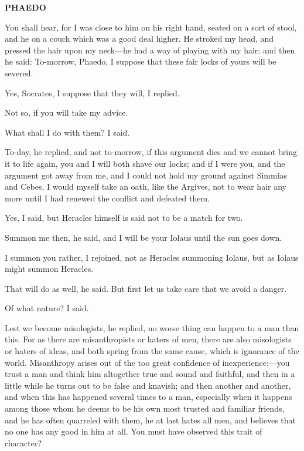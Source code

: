 \documentclass[11pt,letter]{article}
\begin{document}
\par \textbf{PHAEDO}
\par   You shall hear, for I was close to him on his right hand, seated on a sort of stool, and he on a couch which was a good deal higher. He stroked my head, and pressed the hair upon my neck—he had a way of playing with my hair; and then he said:  To-morrow, Phaedo, I suppose that these fair locks of yours will be severed.

\par  Yes, Socrates, I suppose that they will, I replied.

\par  Not so, if you will take my advice.

\par  What shall I do with them? I said.

\par  To-day, he replied, and not to-morrow, if this argument dies and we cannot bring it to life again, you and I will both shave our locks; and if I were you, and the argument got away from me, and I could not hold my ground against Simmias and Cebes, I would myself take an oath, like the Argives, not to wear hair any more until I had renewed the conflict and defeated them.

\par  Yes, I said, but Heracles himself is said not to be a match for two.

\par  Summon me then, he said, and I will be your Iolaus until the sun goes down.

\par  I summon you rather, I rejoined, not as Heracles summoning Iolaus, but as Iolaus might summon Heracles.

\par  That will do as well, he said. But first let us take care that we avoid a danger.

\par  Of what nature? I said.

\par  Lest we become misologists, he replied, no worse thing can happen to a man than this. For as there are misanthropists or haters of men, there are also misologists or haters of ideas, and both spring from the same cause, which is ignorance of the world. Misanthropy arises out of the too great confidence of inexperience;—you trust a man and think him altogether true and sound and faithful, and then in a little while he turns out to be false and knavish; and then another and another, and when this has happened several times to a man, especially when it happens among those whom he deems to be his own most trusted and familiar friends, and he has often quarreled with them, he at last hates all men, and believes that no one has any good in him at all. You must have observed this trait of character?
\end{document}
